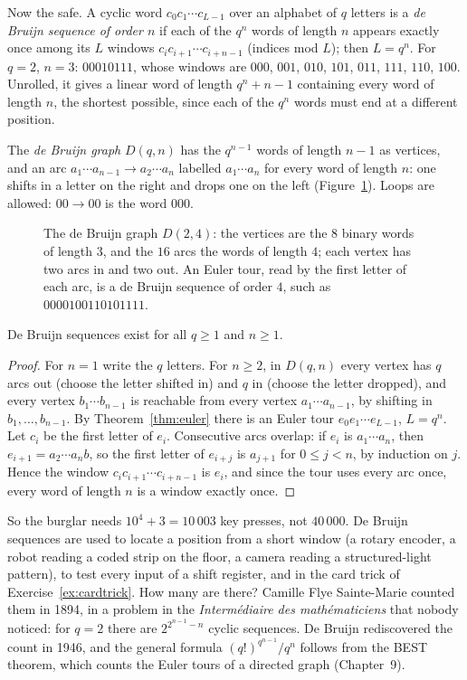 Now the safe. A cyclic word $c_0c_1\cdots c_{L-1}$ over an alphabet of $q$ letters is a \emph{de Bruijn sequence of order $n$} if each of the $q^n$ words of length
$n$ appears exactly once among its $L$ windows $c_ic_{i+1}\cdots c_{i+n-1}$ (indices mod $L$); then $L=q^n$. For $q=2$, $n=3$: $00010111$, whose windows are $000$, $001$,
$010$, $101$, $011$, $111$, $110$, $100$. Unrolled, it gives a linear word of length $q^n+n-1$ containing every word of length $n$, the shortest possible,
since each of the $q^n$ words must end at a different position.

The \emph{de Bruijn graph} $D(q,n)$ has the $q^{n-1}$ words of length $n-1$ as vertices, and an arc $a_1\cdots a_{n-1}\to a_2\cdots a_n$ labelled $a_1\cdots a_n$ for every word of length
$n$: one shifts in a letter on the right and drops one on the left (Figure~\ref{fig:debruijn}). Loops are allowed: $00\to00$ is the word $000$.

\begin{figure}[ht]
\centering
{}
\caption{The de Bruijn graph $D(2,4)$: the vertices are the $8$ binary words of length $3$, and the $16$ arcs the words of length $4$; each
vertex has two arcs in and two out. An Euler tour, read by the first letter of each arc, is a de Bruijn sequence of order $4$,
such as $0000100110101111$.}
\label{fig:debruijn}
\end{figure}

\begin{theorem}\label{thm:debruijn}
De Bruijn sequences exist for all $q\ge1$ and $n\ge1$.
\end{theorem}
\begin{proof}
For $n=1$ write the $q$ letters. For $n\ge2$, in $D(q,n)$ every vertex has $q$ arcs out (choose the letter shifted in) and $q$ in (choose the
letter dropped), and every vertex $b_1\cdots b_{n-1}$ is reachable from every vertex $a_1\cdots a_{n-1}$, by shifting in $b_1,\dots,b_{n-1}$. By
Theorem~\ref{thm:euler} there is an Euler tour $e_0e_1\cdots e_{L-1}$, $L=q^n$. Let $c_i$ be the first letter of $e_i$. Consecutive arcs overlap: if $e_i$ is $a_1\cdots a_n$, then
$e_{i+1}=a_2\cdots a_nb$, so the first letter of $e_{i+j}$ is $a_{j+1}$ for $0\le j<n$, by induction on $j$. Hence the window $c_ic_{i+1}\cdots c_{i+n-1}$ is $e_i$, and since the tour uses
every arc once, every word of length $n$ is a window exactly once.
\end{proof}

So the burglar needs $10^4+3=10\,003$ key presses, not $40\,000$. De Bruijn sequences are used to locate a position from a short
window (a rotary encoder, a robot reading a coded strip on the floor, a camera reading a structured-light pattern), to test every
input of a shift register, and in the card trick of Exercise~\ref{ex:cardtrick}. How many are there? Camille Flye Sainte-Marie
counted them in 1894, in a problem in the \emph{Interm\'ediaire des math\'ematiciens} that nobody noticed: for $q=2$ there are $2^{2^{n-1}-n}$ cyclic
sequences. De Bruijn rediscovered the count in 1946, and the general formula $(q!)^{q^{n-1}}/q^n$ follows from the BEST theorem, which counts the
Euler tours of a directed graph (Chapter~9).

